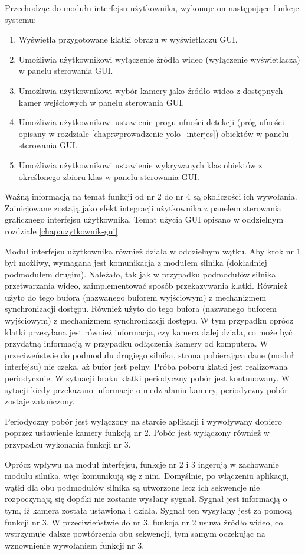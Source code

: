 Przechodząc do modułu interfejsu użytkownika, wykonuje on następujące funkcje systemu:
\begin{enumerate}
    \item Wyświetla przygotowane klatki obrazu w wyświetlaczu GUI.
    \item Umożliwia użytkownikowi wyłączenie źródła wideo (wyłączenie wyświetlacza) w panelu sterowania GUI.
    \item Umożliwia użytkownikowi wybór kamery jako źródło wideo z dostępnych kamer wejściowych w panelu sterowania GUI.
    \item Umożliwia użytkownikowi ustawienie progu ufności detekcji (próg ufności opisany w rozdziale \ref{chap:wprowadzenie-yolo_interjes}) obiektów w panelu sterowania GUI.
    \item Umożliwia użytkownikowi ustawienie wykrywanych klas obiektów z określonego zbioru klas w panelu sterowania GUI.
\end{enumerate}
Ważną informacją na temat funkcji od nr 2 do nr 4 są okoliczości ich wywołania. Zainicjowane zostają jako efekt integracji użytkownika z panelem sterowania graficznego interfejsu użytkownika. Temat użycia GUI opisano w oddzielnym rozdziale \ref{chap:uzytkownik-gui}. 

Moduł interfejsu użytkownika również działa w oddzielnym wątku. Aby krok nr 1 był możliwy, wymagana jest komunikacja z modułem silnika (dokładniej podmodułem drugim).  
Należało, tak jak w przypadku podmodułów silnika przetwarzania wideo, zaimplementować sposób przekazywania klatki. Również użyto do tego bufora (nazwanego buforem wyjściowym) z mechanizmem synchronizacji dostępu. 
Również użyto do tego bufora (nazwanego buforem wyjściowym) z mechanizmem synchronizacji dostępu. W tym przypadku oprócz klatki przesyłana jest również informacja, czy kamera dalej działa, co może być przydatną informacją w przypadku odłączenia kamery od komputera.
W przeciweństwie do podmodułu drugiego silnika, strona pobierająca dane (moduł interfejsu) nie czeka, aż bufor jest pełny. Próba poboru klatki jest realizowana periodycznie. W sytuacji braku klatki periodyczny pobór jest kontuuowany. W sytacji kiedy przekazano informacje o niedziałaniu kamery, periodyczny pobór zostaje zakończony.

Periodyczny pobór jest wyłączony na starcie aplikacji i wywoływany  dopiero poprzez ustawienie kamery funkcją nr 2. Pobór jest wyłączony również w przypadku wykonania funkcji nr 3.

Oprócz wpływu na moduł interfejsu, funkcje nr 2 i 3 ingerują w zachowanie modułu silnika, więc komunikują się z nim. Domyślnie, po włączeniu aplikacji, wątki dla obu podmodułów silnika są utworzone lecz ich sekwencje nie rozpoczynają się dopóki nie zostanie wysłany sygnał. Sygnał jest informacją o tym, iż kamera została ustawiona i działa. Sygnał ten wysyłany jest za pomocą funkcji nr 3. W przeciwieństwie do nr 3, funkcja nr 2 usuwa źródło wideo, co wstrzymuje dalsze powtórzenia obu sekwencji, tym samym oczekując na wznownienie wywołaniem funkcji nr 3.

